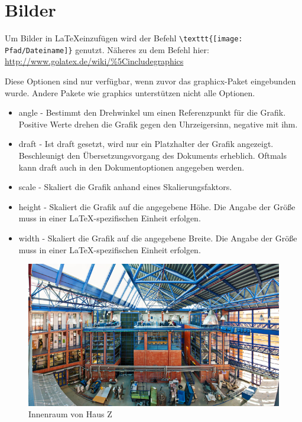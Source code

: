 \chapter{Bilder}

Um Bilder in \LaTeX einzufügen wird der Befehl \verb|\texttt{[image: Pfad/Dateiname]}| genutzt. Näheres zu dem Befehl hier: \url{http://www.golatex.de/wiki/%5Cincludegraphics}

Diese Optionen sind nur verfügbar, wenn zuvor das graphicx-Paket eingebunden wurde. Andere Pakete wie graphics unterstützen nicht alle Optionen.	
\begin{itemize}
\item angle - Bestimmt den Drehwinkel um einen Referenzpunkt für die Grafik. Positive Werte drehen die Grafik gegen den Uhrzeigersinn, negative mit ihm.
\item draft - Ist draft gesetzt, wird nur ein Platzhalter der Grafik angezeigt. Beschleunigt den Übersetzungsvorgang des Dokuments erheblich. Oftmals kann draft auch in den Dokumentoptionen angegeben werden.
\item scale - Skaliert die Grafik anhand eines Skalierungsfaktors.
\item height - Skaliert die Grafik auf die angegebene Höhe. Die Angabe der Größe muss in einer LaTeX-spezifischen Einheit erfolgen.
\item width - Skaliert die Grafik auf die angegebene Breite. Die Angabe der Größe muss in einer LaTeX-spezifischen Einheit erfolgen.
\end{itemize}	

\begin{figure}[ht]
	\centering
	\includegraphics{images/Haus_Z.jpeg}
	\caption{Innenraum von Haus Z \cite{hauszpic}}
	\label{fig1}
\end{figure}

